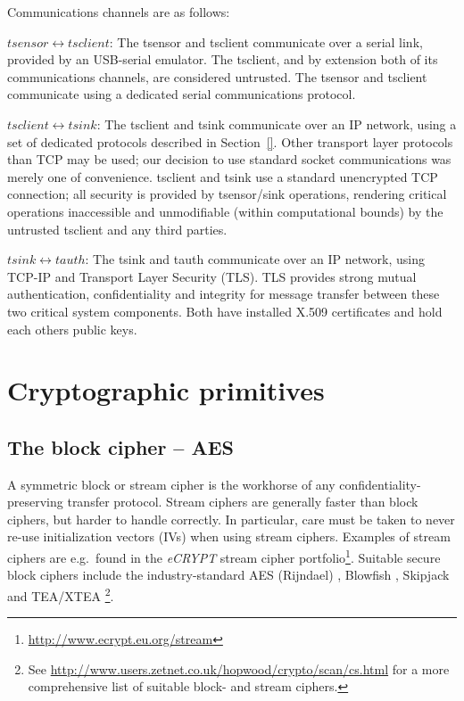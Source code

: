 Communications channels are as follows:
%
\begin{description}
\item {$tsensor \longleftrightarrow tsclient$:}
The tsensor and tsclient communicate over a serial link, provided by an USB-serial emulator. The tsclient, and by extension both of its communications channels, are considered untrusted. The tsensor and tsclient communicate using a dedicated serial communications protocol.

\item {$tsclient \longleftrightarrow tsink$:}
The tsclient and tsink communicate over an IP network, using a set of dedicated protocols described in Section~\ref{}. Other transport layer protocols than TCP may be used; our decision to use standard socket communications was merely one of convenience. 
tsclient and tsink use a standard unencrypted TCP connection; all security is provided by tsensor/sink operations, rendering critical operations inaccessible and unmodifiable (within computational bounds) by the untrusted tsclient and any third parties.

\item {$tsink \longleftrightarrow tauth$:}
The tsink and tauth communicate over an IP network, using TCP-IP and Transport Layer Security (TLS). TLS provides strong mutual authentication, confidentiality and integrity for message transfer between these two critical system components. Both have installed X.509 certificates and hold each others public keys.

\end{description}

\section{Cryptographic primitives}
\label{sec:crypt-prim}

\subsection{The block cipher -- AES}
\label{sec:block-ciphher-aes}

A symmetric block or stream cipher is the workhorse of any confidentiality-preserving transfer protocol. 
%
Stream ciphers are generally faster than block ciphers, but harder to handle correctly. In particular, care must be taken to never re-use initialization vectors (IVs) when using stream ciphers. Examples of stream ciphers are e.g.\ found in the \textit{eCRYPT} stream cipher portfolio\footnote{\url{http://www.ecrypt.eu.org/stream}}. 
%
Suitable secure block ciphers include the industry-standard AES (Rijndael) , Blowfish , Skipjack  and TEA/XTEA \footnote{See  \url{http://www.users.zetnet.co.uk/hopwood/crypto/scan/cs.html} for a more comprehensive list of suitable block- and stream ciphers.}.

